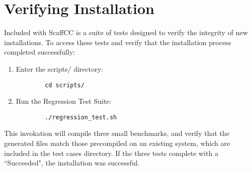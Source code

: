 \section{Verifying Installation}

Included with ScaffCC is a suite of tests designed to verify the integrity of new installations. To access these tests and verify that the installation process completed successfully:

\begin{enumerate}
    \item Enter the scripts/ directory:
    \begin{lstlisting}
        cd scripts/
    \end{lstlisting}
    \item Run the Regression Test Suite:
    \begin{lstlisting}
        ./regression_test.sh
    \end{lstlisting}
\end{enumerate}

This invokation will compile three small benchmarks, and verify that the generated files match those precompiled on an existing system, which are included in the test cases directory. If the three tests complete with a ``Succeeded", the installation was successful.
